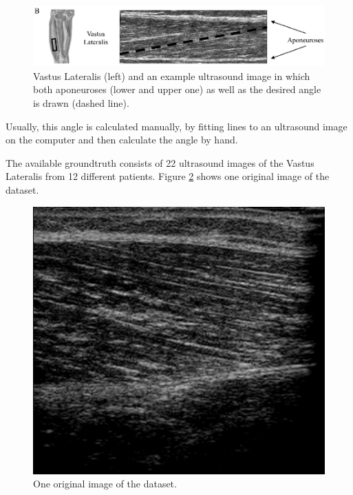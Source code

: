 \documentclass[10pt,twocolumn,letterpaper]{article}
\begin{document}
\begin{figure}
	\begin{center}		
		\includegraphics[width=1\linewidth]{img/VastusLateralis}
	\end{center}
	\caption{Vastus Lateralis (left) and an example ultrasound image in which both aponeuroses (lower and upper one) as well as the desired angle is drawn (dashed line). \cite{NCronin13a}}
	\label{fig:VastusLateralis}
	
\end{figure}

Usually, this angle is calculated manually, by fitting lines to an ultrasound image on the computer and then calculate the angle by hand.

The available groundtruth consists of 22 ultrasound images of the Vastus Lateralis from 12 different patients.
Figure \ref{fig:exImage} shows one original image of the dataset.

\begin{figure}
	\begin{center}		
		\includegraphics[width=1\linewidth]{img/COLLINI_1_cropped}
	\end{center}
	\caption{One original image of the dataset.}
	\label{fig:exImage}
	
\end{figure}
\end{document}
